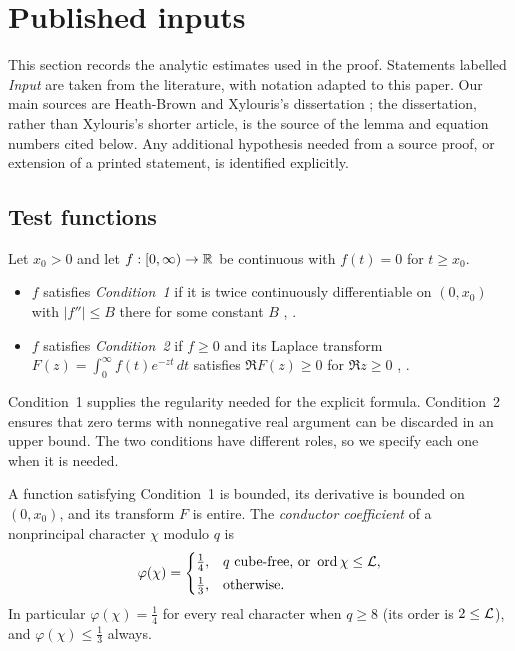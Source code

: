 \section{Published inputs}\label{sec:inputs}

This section records the analytic estimates used in the proof. Statements labelled
\emph{Input} are taken from the literature, with notation adapted to this paper. Our main
sources are Heath-Brown \cite{HeathBrown1992zero} and Xylouris's dissertation
\cite{Xylouris2011nullstellen}; the dissertation, rather than Xylouris's shorter article,
is the source of the lemma and equation numbers cited below. Any additional hypothesis
needed from a source proof, or extension of a printed statement, is identified explicitly.

\subsection{Test functions}

\begin{definition}\label{def:conditions}
Let $x_0>0$ and let $f:[0,\infty)\to\mathbb{R}$ be continuous with $f(t)=0$ for $t\ge x_0$.
\begin{itemize}
  \item $f$ satisfies \emph{Condition~1} if it is twice continuously differentiable on
    $(0,x_0)$ with $|f''|\le B$ there for some constant $B$
    \cite[p.~280]{HeathBrown1992zero}, \cite[Bedingung~1, p.~17]{Xylouris2011nullstellen}.
  \item $f$ satisfies \emph{Condition~2} if $f\ge0$ and its Laplace transform
    $F(z)=\int_0^\infty f(t)e^{-zt}\,dt$ satisfies $\Re F(z)\ge0$ for $\Re z\ge0$
    \cite[p.~286]{HeathBrown1992zero}, \cite[Bedingung~2, p.~18]{Xylouris2011nullstellen}.
\end{itemize}
\end{definition}

Condition~1 supplies the regularity needed for the explicit formula. Condition~2 ensures
that zero terms with nonnegative real argument can be discarded in an upper bound.
The two conditions have different roles, so we specify each one when it is needed.

A function satisfying Condition~1 is bounded, its derivative is bounded on $(0,x_0)$, and its
transform $F$ is entire. The \emph{conductor coefficient} of a nonprincipal character $\chi$ modulo
$q$ is \cite[p.~17]{Xylouris2011nullstellen}
\[
  \varphi(\chi)=\begin{cases}\frac14,& q\text{ cube-free, or }\operatorname{ord}\chi\le\mathcal{L},\\[2pt]
  \frac13,&\text{otherwise.}\end{cases}
\]
In particular $\varphi(\chi)=\frac14$ for every real character when $q\ge8$ (its order is $2\le\mathcal{L}$), and
$\varphi(\chi)\le\frac13$ always.

